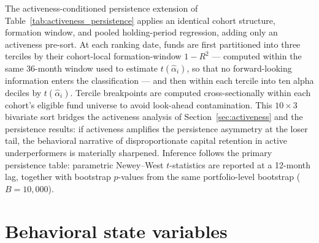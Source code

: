 \documentclass[12pt, oneside]{report}
\begin{document}
The activeness-conditioned persistence extension of
Table~\ref{tab:activeness_persistence} applies an identical cohort
structure, formation window, and pooled holding-period regression,
adding only an activeness pre-sort. At each ranking date, funds are
first partitioned into three terciles by their cohort-local formation-window
$1-R^2$ --- computed within the same 36-month window used to estimate
$t(\hat{\alpha}_i)$, so that no forward-looking information enters the
classification --- and then within each tercile into ten alpha deciles
by $t(\hat{\alpha}_i)$. Tercile breakpoints are computed cross-sectionally
within each cohort's eligible fund universe to avoid look-ahead
contamination. This $10 \times 3$ bivariate sort bridges the
activeness analysis of Section~\ref{sec:activeness} and the persistence
results: if activeness amplifies the persistence asymmetry
at the loser tail, the behavioral narrative of
disproportionate capital retention in active underperformers is
materially sharpened. Inference follows the primary persistence
table: parametric Newey--West $t$-statistics are reported at a 12-month
lag, together with bootstrap $p$-values from the same portfolio-level
bootstrap ($B = 10{,}000$).

\section{Behavioral state variables}
\label{sec:state_variables}
\end{document}
